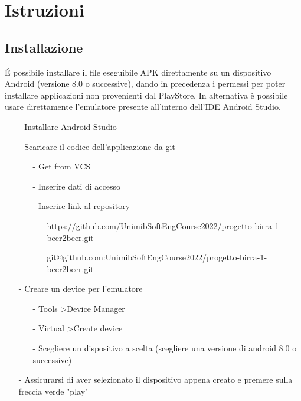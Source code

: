 \documentclass[12pt]{article}
\begin{document}
\newpage
\section{Istruzioni}

\subsection{Installazione}
É possibile installare il file eseguibile APK direttamente su un dispositivo Android (versione 8.0 o successive), dando in precedenza i permessi per poter installare applicazioni non provenienti dal PlayStore.\newline
In alternativa è possibile usare direttamente l'emulatore presente all'interno dell'IDE Android Studio.
\begin{itemize}
    \item[-] Installare Android Studio
    \item[-] Scaricare il codice dell'applicazione da git
    \begin{itemize}
        \item[-] Get from VCS
        \item[-] Inserire dati di accesso
        \item[-] Inserire link al repository
        \begin{itemize}
            \item[  ]https://github.com/UnimibSoftEngCourse2022/progetto-birra-1-beer2beer.git
            \item[  ]git@github.com:UnimibSoftEngCourse2022/progetto-birra-1-beer2beer.git
        \end{itemize}
    \end{itemize}
    \item[-] Creare un device per l'emulatore
    \begin{itemize}
        \item[-] Tools \textgreater \space Device Manager
        \item[-] Virtual \textgreater \space Create device
        \item[-] Scegliere un dispositivo a scelta (scegliere una versione di android 8.0 o successive)
    \end{itemize}
    \item[-] Assicurarsi di aver selezionato il dispositivo appena creato e premere sulla freccia verde "play" 
\end{itemize}
\end{document}
